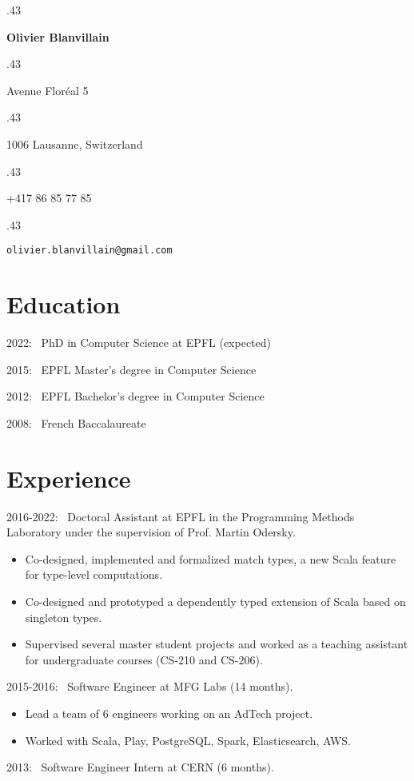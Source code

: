 \documentclass[marginmode, 11pt]{res}
\newcommand{\centered}[1]{\moveleft.43\hoffset\centerline{#1}}
\renewcommand{\:}[0]{:~}
\begin{document}
\centered{\LARGE\textbf{Olivier Blanvillain}}
\vspace{10pt}

\centered{Avenue Floréal 5}
\centered{1006 Lausanne, Switzerland}
\vspace{3pt}
\centered{+417 86 85 77 85}
\vspace{2pt}
\centered{\texttt{olivier.blanvillain@gmail.com}}

\begin{resume}

\section{Education}

2022\: PhD in Computer Science at EPFL (expected)

2015\: EPFL Master's degree in Computer Science

2012\: EPFL Bachelor's degree in Computer Science

2008\: French Baccalaureate

\section{Experience}

2016-2022\: Doctoral Assistant at EPFL in the Programming Methods Laboratory under the supervision of Prof. Martin Odersky.

\begin{itemize}
  \item Co-designed, implemented and formalized match types, a new Scala feature for type-level computations.
  \item Co-designed and prototyped a dependently typed extension of Scala based on singleton types.
  \item Supervised several master student projects and worked as a teaching assistant for undergraduate courses (CS-210 and CS-206).
\end{itemize}

2015-2016\: Software Engineer at MFG Labs (14 months).

\begin{itemize}
  \item Lead a team of 6 engineers working on an AdTech project.
  \item Worked with Scala, Play, PostgreSQL, Spark, Elasticsearch, AWS.
\end{itemize}

2013\: Software Engineer Intern at CERN (6 months).


\end{resume}
\end{document}
